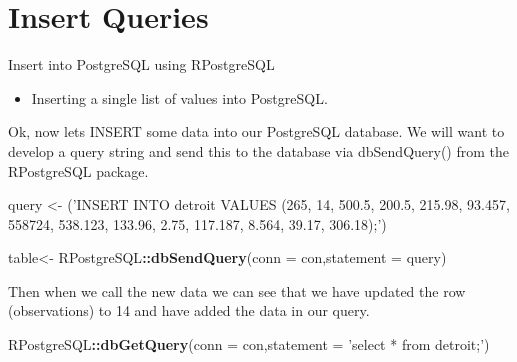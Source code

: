 \documentclass[]{book}
\newenvironment{Shaded}{\begin{snugshade}}{\end{snugshade}}
\newcommand{\KeywordTok}[1]{\textcolor[rgb]{0.13,0.29,0.53}{\textbf{#1}}}
\newcommand{\DataTypeTok}[1]{\textcolor[rgb]{0.13,0.29,0.53}{#1}}
\newcommand{\StringTok}[1]{\textcolor[rgb]{0.31,0.60,0.02}{#1}}
\newcommand{\OperatorTok}[1]{\textcolor[rgb]{0.81,0.36,0.00}{\textbf{#1}}}
\newcommand{\NormalTok}[1]{#1}
\providecommand{\tightlist}{%
  \setlength{\itemsep}{0pt}\setlength{\parskip}{0pt}}
\begin{document}
\section{Insert Queries}\label{insert-queries}

Insert into PostgreSQL using RPostgreSQL

\begin{itemize}
\tightlist
\item
  Inserting a single list of values into PostgreSQL.
\end{itemize}

Ok, now lets INSERT some data into our PostgreSQL database. We will want
to develop a query string and send this to the database via
dbSendQuery() from the RPostgreSQL package.

\begin{Shaded}
\begin{Highlighting}[]
\NormalTok{query <-}\StringTok{ }\NormalTok{(}\StringTok{'INSERT INTO detroit VALUES (265, 14, 500.5, 200.5, 215.98, 93.457, 558724, 538.123, 133.96, 2.75, 117.187, 8.564, 39.17, 306.18);'}\NormalTok{)}

\NormalTok{table<-}\StringTok{ }\NormalTok{RPostgreSQL}\OperatorTok{::}\KeywordTok{dbSendQuery}\NormalTok{(}\DataTypeTok{conn =}\NormalTok{ con,}\DataTypeTok{statement =}\NormalTok{ query)}
\end{Highlighting}
\end{Shaded}

Then when we call the new data we can see that we have updated the row
(observations) to 14 and have added the data in our query.

\begin{Shaded}
\begin{Highlighting}[]
\NormalTok{RPostgreSQL}\OperatorTok{::}\KeywordTok{dbGetQuery}\NormalTok{(}\DataTypeTok{conn =}\NormalTok{ con,}\DataTypeTok{statement =} \StringTok{'select * from detroit;'}\NormalTok{)}
\end{Highlighting}
\end{Shaded}
\end{document}
